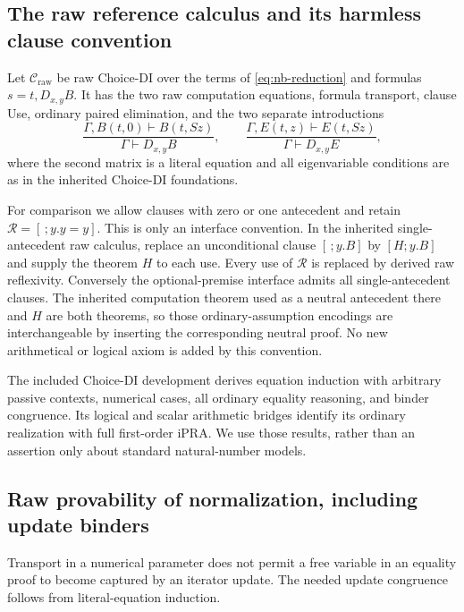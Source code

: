 \subsection{The raw reference calculus and its harmless clause convention}

Let $\mathcal C_{\mathrm{raw}}$ be raw Choice-DI over the terms of
\eqref{eq:nb-reduction} and formulas $s=t,D_{x,y}B$. It has the two raw
computation equations, formula transport, clause Use, ordinary paired
elimination, and the two separate introductions
\[
 \frac{\Gamma,B(t,0)\vdash B(t,Sz)}{\Gamma\vdash D_{x,y}B},
 \qquad
 \frac{\Gamma,E(t,z)\vdash E(t,Sz)}{\Gamma\vdash D_{x,y}E},
 \tag{Raw introductions}\label{eq:nb-raw-intro}
\]
where the second matrix is a literal equation and all eigenvariable
conditions are as in the inherited Choice-DI foundations.

For comparison we allow clauses with zero or one antecedent and retain
$\mathcal R=[\,;y.y=y]$. This is only an interface convention. In the
inherited single-antecedent raw calculus, replace an unconditional clause
$[\,;y.B]$ by $[H;y.B]$ and supply the theorem $H$ to each use.
Every use of $\mathcal R$ is replaced by derived raw reflexivity.
Conversely the optional-premise interface admits all single-antecedent
clauses. The inherited computation theorem used as a neutral antecedent
there and $H$ are both theorems, so those ordinary-assumption encodings
are interchangeable by inserting the corresponding neutral proof.
No new arithmetical or logical axiom is added by this convention.

The included Choice-DI development derives equation induction with
arbitrary passive contexts, numerical cases, all ordinary equality
reasoning, and binder congruence. Its logical and scalar arithmetic
bridges identify its ordinary realization with full first-order iPRA.
We use those results, rather than an assertion only about standard
natural-number models.

\subsection{Raw provability of normalization, including update binders}

Transport in a numerical parameter does not permit a free variable in
an equality proof to become captured by an iterator update. The needed
update congruence follows from literal-equation induction.

